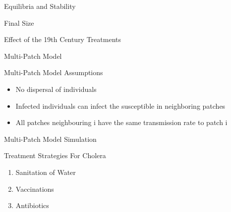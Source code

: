 \documentclass{beamer}\usepackage[]{graphicx}\usepackage[]{color}
\begin{document}
\begin{frame}{Equilibria and Stability}

\end{frame}

\begin{frame}{Final Size}

\end{frame}

\begin{frame}{Effect of the 19th Century Treatments}

\end{frame}

\begin{frame}{Multi-Patch Model}

\end{frame}

\begin{frame}{Multi-Patch Model Assumptions}
\begin{itemize}
\setlength\itemsep{2em}
\item No dispersal of individuals
\item Infected individuals can infect the susceptible in neighboring patches
\item All patches neighbouring i have the same transmission rate to patch i 
\end{itemize}
\end{frame}

\begin{frame}{Multi-Patch Model Simulation}

\end{frame}

\begin{frame}{Treatment Strategies For Cholera}
\begin{enumerate}
\setlength\itemsep{2em}
\item Sanitation of Water
\item Vaccinations
\item Antibiotics
\end{enumerate}
\end{frame}
\end{document}
